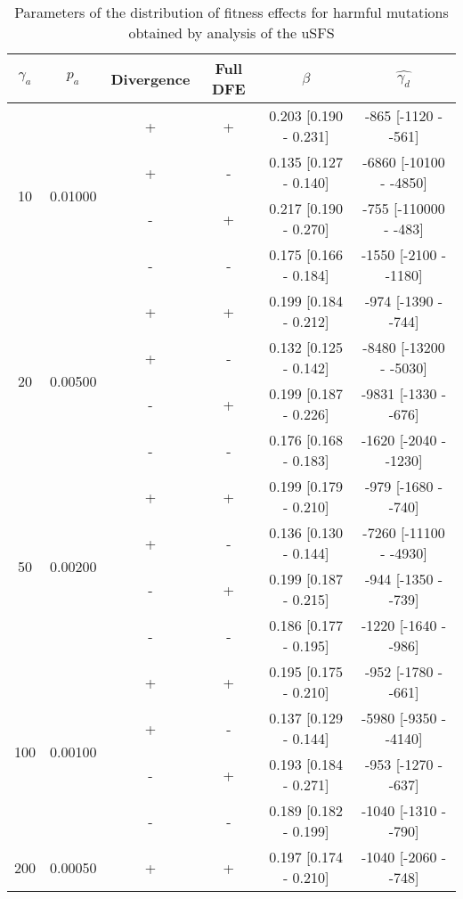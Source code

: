 
\begin{table}
   \centering
   \begin{threeparttable}[b]
\caption{Parameters of the distribution of fitness effects for harmful mutations obtained by analysis of the uSFS }

\begin{tabular}{cccccc}
\toprule
$\gamma_a$ & $p_a$ & Divergence\tnote{a} & Full DFE\tnote{b} & $\beta$\tnote{c} & $\hat{\gamma_d}$ \tnote{c} \\
\midrule
 \multirow{4}{*}{10}&\multirow{4}{*}{0.01000}&        + &        + &  0.203 [0.190 - 0.231] &  -865 [-1120 -  -561] \\
 &&        + &        - &  0.135 [0.127 - 0.140] & -6860 [-10100 -  -4850] \\
 &&        - &        + &  0.217 [0.190 - 0.270] &  -755 [-110000 -  -483] \\
 &&        - &        - &  0.175 [0.166 - 0.184] & -1550 [-2100 -  -1180] \\ \hline
 \multirow{4}{*}{20}&\multirow{4}{*}{0.00500}&        + &        + &  0.199 [0.184 - 0.212] &  -974 [-1390 -  -744] \\
 &&        + &        - &  0.132 [0.125 - 0.142] & -8480 [-13200 -  -5030] \\
 &&        - &        + &  0.199 [0.187 - 0.226] & -9831 [-1330 -  -676] \\
 &&        - &        - &  0.176 [0.168 - 0.183] & -1620 [-2040 -  -1230] \\ \hline
 \multirow{4}{*}{50}&\multirow{4}{*}{0.00200}&        + &        + &  0.199 [0.179 - 0.210] &  -979 [-1680 -  -740] \\
 &&        + &        - &  0.136 [0.130 - 0.144] & -7260 [-11100 -  -4930] \\
 &&        - &        + &  0.199 [0.187 - 0.215] &  -944 [-1350 -  -739] \\
   &&      - &        - &  0.186 [0.177 - 0.195] & -1220 [-1640 -  -986] \\ \hline
      \multirow{4}{*}{100}&\multirow{4}{*}{0.00100}&   + &        + &  0.195 [0.175 - 0.210] &  -952 [-1780 -  -661] \\
       &&  + &        - &  0.137 [0.129 - 0.144] & -5980 [-9350 -  -4140] \\
         &&- &        + &  0.193 [0.184 - 0.271] &  -953 [-1270 -  -637] \\
&&         - &        - &  0.189 [0.182 - 0.199] & -1040 [-1310 -  -790] \\ \hline
   \multirow{4}{*}{200}&\multirow{4}{*}{0.00050}&       + &        + &  0.197 [0.174 - 0.210] & -1040 [-2060 -  -748] \\

\end{tabular}
\end{threeparttable}
\end{table}
